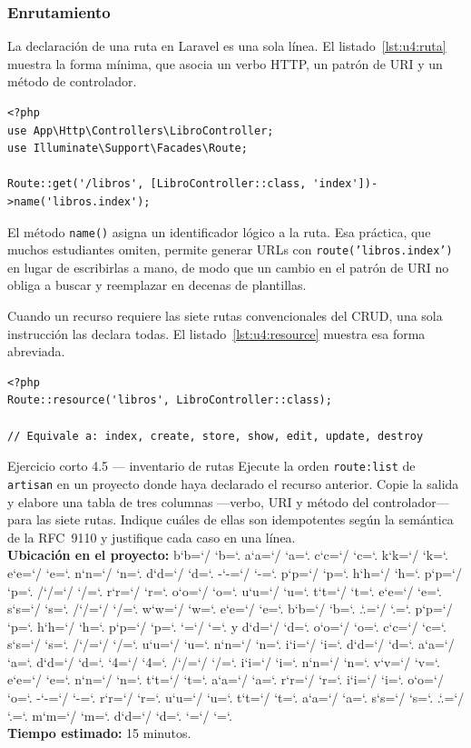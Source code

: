\documentclass[11pt,a4paper,openany]{book}
\newcommand{\ruta}[1]{{\ttfamily\small\rutaaux #1\relax}}
\def\rutaaux{\futurelet\next\rutapaso}
\def\rutapaso{%
	\ifx\next\relax \let\sig\relax
	\else \let\sig\rutaimprime \fi \sig}
\def\rutaimprime#1{%
	#1\ifnum`#1=`/ \allowbreak\fi
	\ifnum`#1=`. \allowbreak\fi
	\rutaaux}
\begin{document}
\subsubsection{Enrutamiento}

La declaración de una ruta en Laravel es una sola línea. El listado~\ref{lst:u4:ruta} muestra la forma mínima, que asocia un verbo HTTP, un patrón de URI y un método de controlador.

\begin{lstlisting}[style=php,caption={Declaracion minima de una ruta en Laravel.},label={lst:u4:ruta}]
<?php
use App\Http\Controllers\LibroController;
use Illuminate\Support\Facades\Route;

Route::get('/libros', [LibroController::class, 'index'])->name('libros.index');
\end{lstlisting}

El método \texttt{name()} asigna un identificador lógico a la ruta. Esa práctica, que muchos estudiantes omiten, permite generar URLs con \texttt{route('libros.index')} en lugar de escribirlas a mano, de modo que un cambio en el patrón de URI no obliga a buscar y reemplazar en decenas de plantillas.

Cuando un recurso requiere las siete rutas convencionales del CRUD, una sola instrucción las declara todas. El listado~\ref{lst:u4:resource} muestra esa forma abreviada.

\begin{lstlisting}[style=php,caption={Declaracion de las siete rutas convencionales de un recurso.},label={lst:u4:resource}]
<?php
Route::resource('libros', LibroController::class);

// Equivale a: index, create, store, show, edit, update, destroy
\end{lstlisting}

\begin{cajaejercicio}{Ejercicio corto 4.5 --- inventario de rutas}
	Ejecute la orden \texttt{route:list} de \texttt{artisan} en un proyecto donde haya declarado el recurso anterior. Copie la salida y elabore una tabla de tres columnas ---verbo, URI y método del controlador--- para las siete rutas. Indique cuáles de ellas son idempotentes según la semántica de la RFC~9110 \cite{rfc9110} y justifique cada caso en una línea.\\[3pt]
	\textbf{Ubicación en el proyecto:} \ruta{backend-php/routes/web.php} y \ruta{docs/unidad4/inventario-rutas.md}\\[3pt]
	\textbf{Tiempo estimado:} 15 minutos.
\end{cajaejercicio}
\end{document}
